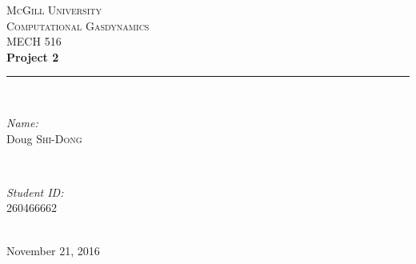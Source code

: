 \begin{titlepage}

\newcommand{\HRule}{\rule{\linewidth}{0.5mm}} %

\center %
 


\textsc{\LARGE McGill University}\\[3.5cm]
\textsc{\Large Computational Gasdynamics}\\[0.5cm] 
\textsc{\large MECH 516}\\[2.5cm]


{ \huge \bfseries Project 2}\\[1.5cm] %

\HRule \\[0.4cm]

\begin{minipage}{0.4\textwidth}
\begin{flushleft} \large
\emph{Name:}\\
Doug \textsc{Shi-Dong} %
\end{flushleft}
\end{minipage}
~
\begin{minipage}{0.4\textwidth}
\begin{flushright} \large
\emph{Student ID:} \\
260466662\\
\end{flushright}
\end{minipage}\\[4cm]

\vfill{}
{\large November 21, 2016}\\[2cm]

\end{titlepage}
